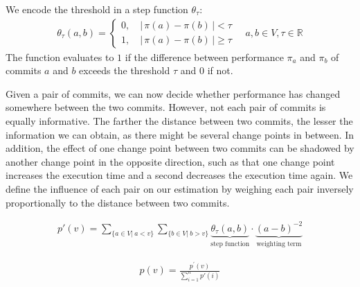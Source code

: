 \documentclass[sigconf, screen]{acmart}
\begin{document}
	We encode the threshold in a step function $\theta_\tau$:
	\begin{equation}\label{eq:theta}
	\begin{gathered}
	\theta_\tau(a, b) = \begin{cases}
	0,\quad \vert\,\pi(a) - \pi(b)\,\vert < \tau\\
	1,\quad \vert\,\pi(a) - \pi(b)\,\vert \geq \tau
	\end{cases}\quad a, b \in V, \tau \in \mathbb{R}
	\end{gathered}
	\end{equation}
	The function evaluates to $1$ if the difference between performance $\pi_a$ and $\pi_b$ of commits $a$ and $b$ exceeds the threshold $\tau$ and $0$ if not.
	
	Given a pair of commits, we can now decide whether performance has changed somewhere between the two commits.
	However, not each pair of commits is equally informative.
	The farther the distance between two commits, the lesser the information we can obtain, as there might be several change points in between. 
	In addition, the effect of one change point between two commits can be shadowed by another change point in the opposite direction, such as that one change point increases the execution time and a second decreases the execution time again.
	We define the influence of each pair on our estimation by weighing each pair inversely proportionally to the distance between two commits.
	
	\begin{equation}\label{eq:cpp}
	\begin{gathered}
	p'(v) = \sum_{\lbrace a \in V \vert~ a < v\rbrace} \sum_{\lbrace b \in V \vert~ b > v\rbrace} \underbrace{\theta_\tau(a, b)}_{\text{step function}} \cdot \underbrace{(a-b)^{-2}}_{\text{weighting term}}
	\end{gathered}
	\end{equation}
	
	\begin{equation}\label{eq:normalize}
	\begin{gathered}
	p(v) = \frac{p^\prime(v)}{\sum_{i=1}^{n} p'(i)}
	\end{gathered}
	\end{equation}
	
\end{document}
